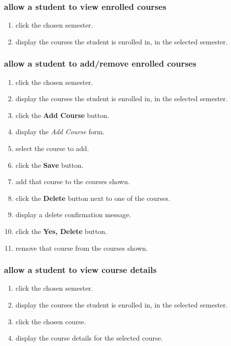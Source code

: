 \documentclass[12pt]{article}
\newenvironment{requirement}[1]
{
    \renewcommand{\thesubsubsection}{R\arabic{subsubsection}.}
    \renewcommand{\labelenumi}{
        \arabic{subsubsection}.\arabic{enumi}
    }
    \renewcommand{\labelenumii}{
        \arabic{subsubsection}.\arabic{enumi}.\arabic{enumii}
    }
    \renewcommand{\labelenumiii}{
        \arabic{subsubsection}.\arabic{enumi}.\arabic{enumii}.\arabic{enumiii}
    }
    \renewcommand{\labelenumiv}{
        \arabic{subsubsection}.\arabic{enumi}.\arabic{enumii}.\arabic{enumiii}.\arabic{enumiv}
    }
    \subsubsection{#1}
    \begin{enumerate}
}
{
    \end{enumerate}
}
\begin{document}
\newcommand{\navcourses}{
    \navsemesters
    \item \stushall click the chosen semester.
    \item \sysshall display the courses the student is enrolled in, in the selected semester.
}

\begin{requirement}{\sysshall allow a student to view enrolled courses}
    \navcourses
    \gotohome
\end{requirement}

\begin{requirement}{\sysshall allow a student to add/remove enrolled courses}
    \navcourses
    \item \stushall click the \textbf{Add Course} button.
    \item \sysshall display the \emph{Add Course} form.
    \item \stushall select the course to add.
    \item \stushall click the \textbf{Save} button.
    \item \sysshall add that course to the courses shown.
    \item \stushall click the \textbf{Delete} button next to one of the courses.
    \item \sysshall display a delete confirmation message.
    \item \stushall click the \textbf{Yes, Delete} button.
    \item \sysshall remove that course from the courses shown.
    \gotohome
\end{requirement}

\newcommand{\navcoursedetails}{
    \navcourses
    \item \stushall click the chosen course.
    \item \sysshall display the course details for the selected course.
}

\begin{requirement}{\sysshall allow a student to view course details}
    \navcoursedetails
    \gotohome
\end{requirement}
\end{document}
